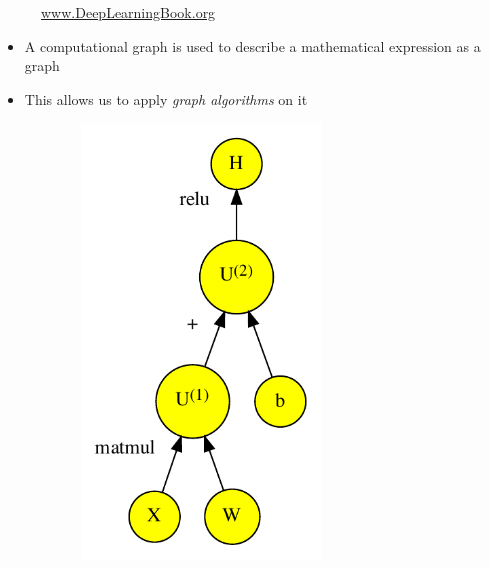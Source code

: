 \documentclass[t]{beamer} %
\begin{document}
\begin{frame}
\begin{figure}
\begin{minipage}{0.45\textwidth}
\begin{figure}[]
            \end{figure}
        \end{minipage}
        \caption{\href{http://www.deeplearningbook.org}{www.DeepLearningBook.org}}
    \end{figure}
    \begin{itemize}[<+->]
        \item A computational graph is used to describe a mathematical expression as a graph
        \item This allows us to apply \emph{graph algorithms} on it
    \end{itemize}
\end{frame}

\begin{frame}
    \begin{figure}
        \centering
        \begin{minipage}{0.45\textwidth}
            \begin{figure}[]
                \centering
                \includegraphics[width=0.7\textwidth]{../plots/computational-graph-c-crop.pdf}

\end{figure}
\end{minipage}
\end{figure}
\end{frame}
\end{document}
